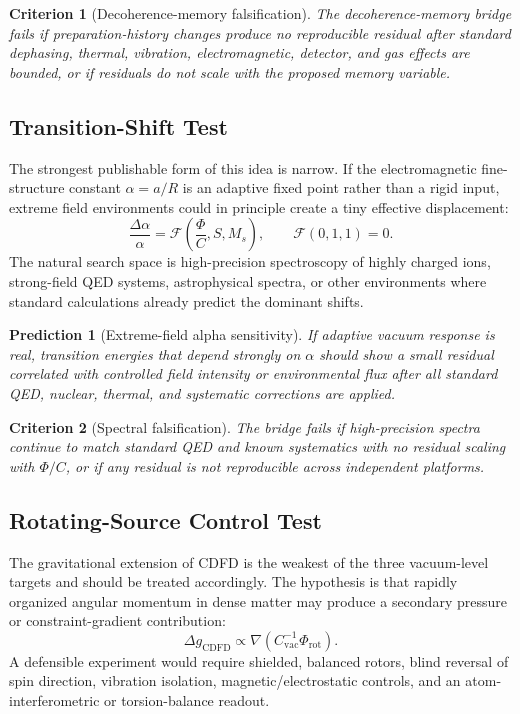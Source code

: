 \documentclass[11pt]{article}
\newtheorem{prediction}{Prediction}
\newtheorem{criterion}{Criterion}
\begin{document}
\begin{criterion}[Decoherence-memory falsification]
The decoherence-memory bridge fails if preparation-history changes produce no
reproducible residual after standard dephasing, thermal, vibration,
electromagnetic, detector, and gas effects are bounded, or if residuals do not
scale with the proposed memory variable.
\end{criterion}

\subsection{Transition-Shift Test}

The strongest publishable form of this idea is narrow. If the electromagnetic
fine-structure constant $\alpha=a/R$ is an
adaptive fixed point rather than a rigid input, extreme field
environments could in principle create a tiny effective displacement:
\begin{equation}
    \frac{\Delta\alpha}{\alpha}
    =
    \mathcal{F}\!\left(\frac{\Phi}{C},S,M_s\right),
    \qquad
    \mathcal{F}(0,1,1)=0.
\end{equation}
The natural search space is high-precision spectroscopy of highly charged ions,
strong-field QED systems, astrophysical spectra, or other environments where
standard calculations already predict the dominant shifts.

\begin{prediction}[Extreme-field alpha sensitivity]
If adaptive vacuum response is real, transition energies that depend strongly on
$\alpha$ should show a small residual correlated with controlled field intensity
or environmental flux after all standard QED, nuclear, thermal, and systematic
corrections are applied.
\end{prediction}

\begin{criterion}[Spectral falsification]
The bridge fails if high-precision spectra continue to match standard QED and
known systematics with no residual scaling with $\Phi/C$, or if any residual is
not reproducible across independent platforms.
\end{criterion}

\subsection{Rotating-Source Control Test}

The gravitational extension of CDFD is the weakest of the three vacuum-level
targets and should be treated accordingly. The hypothesis is that rapidly
organized angular momentum in dense matter may produce a secondary pressure or
constraint-gradient contribution:
\begin{equation}
    \Delta g_{\mathrm{CDFD}}
    \propto
    \nabla\!\left(C_{\mathrm{vac}}^{-1}\Phi_{\mathrm{rot}}\right).
\end{equation}
A defensible experiment would require shielded, balanced rotors, blind reversal
of spin direction, vibration isolation, magnetic/electrostatic controls, and an
atom-interferometric or torsion-balance readout.
\end{document}
